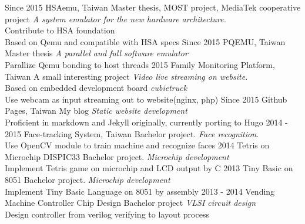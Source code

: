\documentclass[]{friggeri-cv}
\begin{document}
\begin{entrylist}
  \entry
    {Since 2015}
    {HSAemu, Taiwan}
    {Master thesis, MOST project, MediaTek cooperative project}
    {\emph{A system emulator for the new hardware architecture.} \\
	Contribute to HSA foundation \\
	Based on Qemu and compatible with HSA specs}
  \entry
    {Since 2015}
    {PQEMU, Taiwan}
    {Master thesis}
    {\emph{A parallel and full software emulator}\\
	Parallize Qemu bonding to host threads}
  \entry
    {2015}
    {Family Monitoring Platform, Taiwan}
    {A small interesting project}
    {\emph{Video live streaming on website.} \\
	Based on embedded development board \emph{cubietruck}\\ 
	Use webcam as input streaming out to website(nginx, php)}
  \entry
    {Since 2015}
    {Github Pages, Taiwan}
    {My blog}
    {\emph{Static website development} \\
	Proficient in markdown and Jekyll originally, currently porting to Hugo}
  \entry
    {2014 - 2015}
    {Face-tracking System, Taiwan}
    {Bachelor project.}
    {\emph{Face recognition.} \\ 
	Use OpenCV module to train machine and recognize faces}
  \entry
	{2014}
	{Tetris on Microchip DISPIC33}
    {Bachelor project.}
    {\emph{Microchip development} \\
	Implement Tetris game on microchip and LCD output by C}
  \entry
    {2013}
	{Tiny Basic on 8051}
    {Bachelor project.}
    {\emph{Microchip development} \\
	Implement Tiny Basic Language on 8051 by assembly}
  \entry
    {2013 - 2014}
	{Vending Machine Controller Chip Design}
    {Bachelor project}
    {\emph{VLSI circuit design} \\
	Design controller from verilog verifying to layout process}
\end{entrylist}
\end{document}
